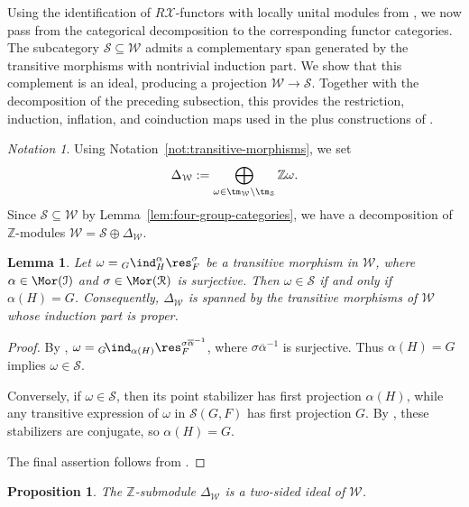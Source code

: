 \documentclass{amsart}
\numberwithin{equation}{section}%
\newtheorem{Prop}[equation]{Proposition}
\newtheorem{Lem}[equation]{Lemma}
\theoremstyle{remark}
\newtheorem{Not}[equation]{Notation}
\theoremstyle{definition}
\newcommand{\lind}[1]{{}_{#1}\!\ind}
\newcommand{\ol}[1]{\overline{#1}}
\begin{document}
Using the identification of $R\mathcal X$-functors with locally
unital modules from , we now pass from the
categorical decomposition to the corresponding functor categories.
The subcategory $\mathcal S\subseteq\mathcal W$ admits a
complementary span generated by the transitive morphisms with
nontrivial induction part. We show that this complement is an ideal,
producing a projection $\mathcal W\to\mathcal S$. Together with the
decomposition of the preceding subsection, this provides the
restriction, induction, inflation, and coinduction maps used in the 
plus constructions of .
%
\begin{Not}
\label{not:Delta-W}
Using Notation~\ref{not:transitive-morphisms}, we set
%
\[
\Delta_{\mathcal W}
:=
\bigoplus_{\omega\in
	\tm_{\mathcal W}\setminus\tm_{\mathcal S}}
\mathbb Z\omega.
\]
%
Since $\mathcal S\subseteq\mathcal W$ by
Lemma~\ref{lem:four-group-categories}, we have a decomposition
of $\mathbb Z$-modules
$\mathcal W
=
\mathcal S\oplus\Delta_{\mathcal W}$.
\end{Not}
%
\begin{Lem}
\label{lem:Delta-W-transitive}
Let
$\omega={}_G\ind_H^\alpha\res_F^\sigma$
be a transitive morphism in $\mathcal W$, where
$\alpha\in\Mor(\mathcal I)$ and
$\sigma\in\Mor(\mathcal R)$ is surjective.
Then $\omega\in\mathcal S$ if and only if $\alpha(H)=G$.
Consequently, $\Delta_{\mathcal W}$ is spanned by the
transitive morphisms of $\mathcal W$ whose induction part is
proper.
\end{Lem}
%
\begin{proof}
By ,
$\omega
=
\lind{G}_{\alpha(H)}
\res_F^{\sigma\ol{\alpha}^{-1}}$,
where $\sigma\ol{\alpha}^{-1}$ is surjective.
Thus $\alpha(H)=G$ implies $\omega\in\mathcal S$.

Conversely, if $\omega\in\mathcal S$, then its point stabilizer has
first projection $\alpha(H)$, while any transitive expression of
$\omega$ in $\mathcal S(G,F)$ has first projection $G$.
By , these stabilizers are conjugate, so
$\alpha(H)=G$.

The final assertion follows from .
\end{proof}
%
\begin{Prop}
\label{prop:Delta-W-ideal}
The $\mathbb Z$-submodule
$\Delta_{\mathcal W}$ is a two-sided ideal of
$\mathcal W$.
\end{Prop}
%
\end{document}
